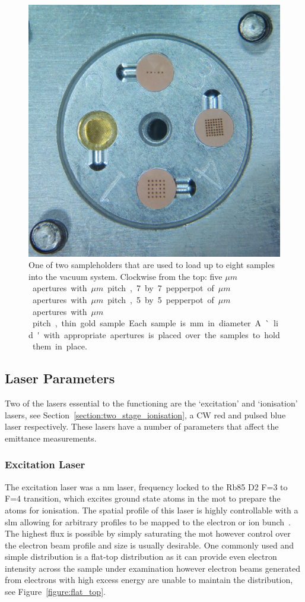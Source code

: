 \begin{figure}
    \center
    \includegraphics[width=0.49\linewidth]{part2/Figs/sample_holder.jpg}
    \caption{One of two sampleholders that are used to load up to eight samples into the vacuum system. Clockwise from the top: five \unit[50]{$\mu m$} apertures with \unit[300]{$\mu m$} pitch, 7 by 7 pepperpot of \unit[50]{$\mu m$} apertures with \unit[200]{$\mu m$} pitch, 5 by 5 pepperpot of \unit[50]{$\mu m$} apertures with \unit[300]{$\mu m$} pitch, thin gold sample. Each sample is \unit[3]{mm} in diameter. A `lid' with appropriate apertures is placed over the samples to hold them in place.}
    \label{figure:sample_holder_pepperpots}
\end{figure}

\subsection{Laser Parameters}
Two of the lasers essential to the functioning are the `excitation' and `ionisation' lasers, see Section~\ref{section:two_stage_ionisation}, a CW red and pulsed blue laser respectively.
These lasers have a number of parameters that affect the emittance measurements.

\subsubsection{Excitation Laser}
The excitation laser was a \unit[780]{nm} laser, frequency locked to the Rb85 D2 F=3 to F=4 transition, which excites ground state atoms in the \gls{mot} to prepare the atoms for ionisation.
The spatial profile of this laser is highly controllable with a \gls{slm} allowing for arbitrary profiles to be mapped to the electron or ion bunch~\cite{mcculloch_arbitrarily_2011}.
The highest flux is possible by simply saturating the \gls{mot} however control over the electron beam profile and size is usually desirable.
One commonly used and simple distribution is a flat-top distribution as it can provide even electron intensity across the sample under examination however electron beams generated from electrons with high excess energy are unable to maintain the distribution, see Figure~\ref{figure:flat_top}.


